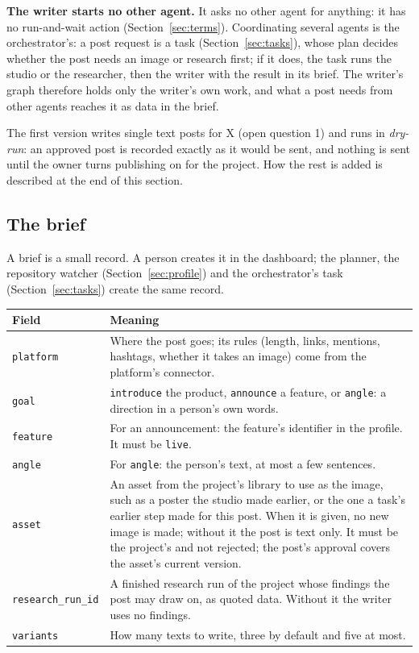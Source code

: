 \documentclass[11pt,a4paper]{article}
\begin{document}
\textbf{The writer starts no other agent.} It asks no other agent for anything: it has no run-and-wait action (Section~\ref{sec:terms}). Coordinating several agents is the orchestrator's: a post request is a task (Section~\ref{sec:tasks}), whose plan decides whether the post needs an image or research first; if it does, the task runs the studio or the researcher, then the writer with the result in its brief. The writer's graph therefore holds only the writer's own work, and what a post needs from other agents reaches it as data in the brief.

The first version writes single text posts for X (open question 1) and runs in \emph{dry-run}: an approved post is recorded exactly as it would be sent, and nothing is sent until the owner turns publishing on for the project. How the rest is added is described at the end of this section.

\subsection{The brief}
A brief is a small record. A person creates it in the dashboard; the planner, the repository watcher (Section~\ref{sec:profile}) and the orchestrator's task (Section~\ref{sec:tasks}) create the same record.

\begin{longtable}{@{}p{3.0cm}p{12.3cm}@{}}
\toprule
\textbf{Field} & \textbf{Meaning}\\
\midrule
\endhead
\texttt{platform} & Where the post goes; its rules (length, links, mentions, hashtags, whether it takes an image) come from the platform's connector.\\
\texttt{goal} & \texttt{introduce} the product, \texttt{announce} a feature, or \texttt{angle}: a direction in a person's own words.\\
\texttt{feature} & For an announcement: the feature's identifier in the profile. It must be \texttt{live}.\\
\texttt{angle} & For \texttt{angle}: the person's text, at most a few sentences.\\
\texttt{asset} & An asset from the project's library to use as the image, such as a poster the studio made earlier, or the one a task's earlier step made for this post. When it is given, no new image is made; without it the post is text only. It must be the project's and not rejected; the post's approval covers the asset's current version.\\
\texttt{research\_run\_id} & A finished research run of the project whose findings the post may draw on, as quoted data. Without it the writer uses no findings.\\
\texttt{variants} & How many texts to write, three by default and five at most.\\
\bottomrule
\end{longtable}
\end{document}
